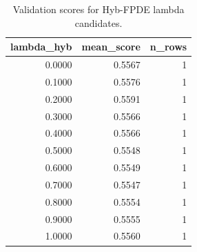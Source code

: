 \begin{table}[t]
\caption{Validation scores for Hyb-FPDE lambda candidates.}
\label{tab:lambda_distribution_computed}
\centering
\begin{tabular}{rrr}
\toprule
lambda\_hyb & mean\_score & n\_rows \\
\midrule
0.0000 & 0.5567 & 1 \\
0.1000 & 0.5576 & 1 \\
0.2000 & 0.5591 & 1 \\
0.3000 & 0.5566 & 1 \\
0.4000 & 0.5566 & 1 \\
0.5000 & 0.5548 & 1 \\
0.6000 & 0.5549 & 1 \\
0.7000 & 0.5547 & 1 \\
0.8000 & 0.5554 & 1 \\
0.9000 & 0.5555 & 1 \\
1.0000 & 0.5560 & 1 \\
\bottomrule
\end{tabular}

\end{table}
